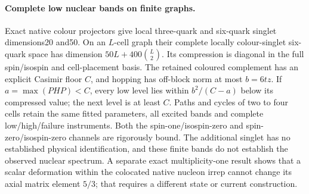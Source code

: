 \paragraph{Complete low nuclear bands on finite graphs.}
Exact native colour projectors give local three-quark and six-quark
singlet dimensions20 and50. On an $L$-cell graph their complete locally
colour-singlet six-quark space has dimension
$50L+400\binom{L}{2}$. Its compression is diagonal in the full spin/isospin
and cell-placement basis. The retained coloured complement has an explicit
Casimir floor $C$, and hopping has off-block norm at most $b=6tz$.
If $a=\max(PHP)<C$, every low level lies within
$b^2/(C-a)$ below its compressed value; the next level is at least $C$.
Paths and cycles of two to four cells retain the same fitted parameters,
all excited bands and complete low/high/failure instruments. Both the
spin-one/isospin-zero and spin-zero/isospin-zero channels are rigorously
bound. The additional singlet has no established physical identification,
and these finite bands do not establish the observed nuclear spectrum.
A separate exact multiplicity-one result shows that a
scalar deformation within the colocated native nucleon irrep cannot change
its axial matrix element $5/3$; that requires a different state or current
construction.
